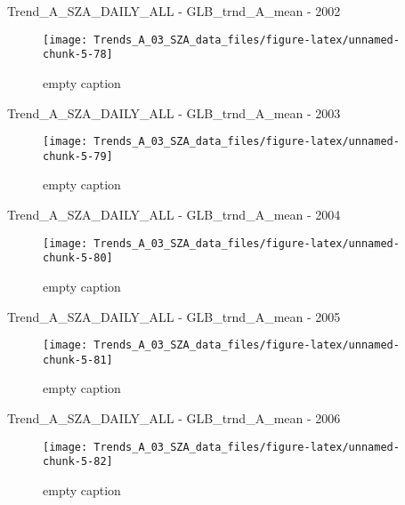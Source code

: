\documentclass[
  10pt,
  a4paper,oneside]{article}
\begin{document}
Trend\_A\_SZA\_DAILY\_ALL - GLB\_trnd\_A\_mean - 2002

\begin{figure}[!ht]

{\centering \texttt{[image: Trends\_A\_03\_SZA\_data\_files/figure-latex/unnamed-chunk-5-78]} 

}

\caption{ empty caption }\label{fig:unnamed-chunk-5-78}
\end{figure}

Trend\_A\_SZA\_DAILY\_ALL - GLB\_trnd\_A\_mean - 2003

\begin{figure}[!ht]

{\centering \texttt{[image: Trends\_A\_03\_SZA\_data\_files/figure-latex/unnamed-chunk-5-79]} 

}

\caption{ empty caption }\label{fig:unnamed-chunk-5-79}
\end{figure}

Trend\_A\_SZA\_DAILY\_ALL - GLB\_trnd\_A\_mean - 2004

\begin{figure}[!ht]

{\centering \texttt{[image: Trends\_A\_03\_SZA\_data\_files/figure-latex/unnamed-chunk-5-80]} 

}

\caption{ empty caption }\label{fig:unnamed-chunk-5-80}
\end{figure}

Trend\_A\_SZA\_DAILY\_ALL - GLB\_trnd\_A\_mean - 2005

\begin{figure}[!ht]

{\centering \texttt{[image: Trends\_A\_03\_SZA\_data\_files/figure-latex/unnamed-chunk-5-81]} 

}

\caption{ empty caption }\label{fig:unnamed-chunk-5-81}
\end{figure}

Trend\_A\_SZA\_DAILY\_ALL - GLB\_trnd\_A\_mean - 2006

\begin{figure}[!ht]

{\centering \texttt{[image: Trends\_A\_03\_SZA\_data\_files/figure-latex/unnamed-chunk-5-82]} 

}

\caption{ empty caption }\label{fig:unnamed-chunk-5-82}
\end{figure}
\end{document}
